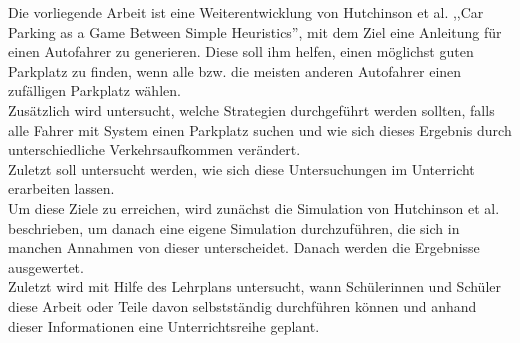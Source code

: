 Die vorliegende Arbeit ist eine Weiterentwicklung von Hutchinson et al. ,,Car Parking as a Game Between Simple Heuristics'', mit dem Ziel eine Anleitung für einen Autofahrer zu generieren. Diese soll ihm helfen, einen möglichst guten Parkplatz zu finden, wenn alle bzw. die meisten anderen Autofahrer einen zufälligen Parkplatz wählen.\\
Zusätzlich wird untersucht, welche Strategien durchgeführt werden sollten, falls alle Fahrer mit System einen Parkplatz suchen und wie sich dieses Ergebnis durch unterschiedliche Verkehrsaufkommen verändert.\\
 Zuletzt soll untersucht werden, wie sich diese Untersuchungen im Unterricht erarbeiten lassen.\\
  Um diese Ziele zu erreichen, wird zunächst die Simulation von Hutchinson et al. beschrieben, um danach eine eigene Simulation durchzuführen, die sich in manchen Annahmen von dieser unterscheidet. Danach werden die Ergebnisse ausgewertet.\\
  Zuletzt wird mit Hilfe des Lehrplans untersucht, wann Schülerinnen und Schüler diese Arbeit oder Teile davon selbstständig durchführen können und anhand dieser Informationen eine Unterrichtsreihe geplant.\\
  